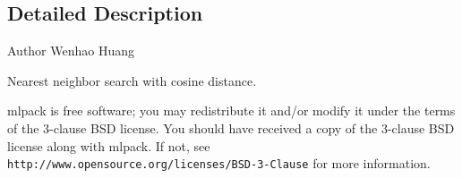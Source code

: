 \subsection{Detailed Description}
\begin{DoxyAuthor}{Author}
Wenhao Huang
\end{DoxyAuthor}
Nearest neighbor search with cosine distance.

mlpack is free software; you may redistribute it and/or modify it under the terms of the 3-\/clause B\+SD license. You should have received a copy of the 3-\/clause B\+SD license along with mlpack. If not, see {\tt http\+://www.\+opensource.\+org/licenses/\+B\+S\+D-\/3-\/\+Clause} for more information. 